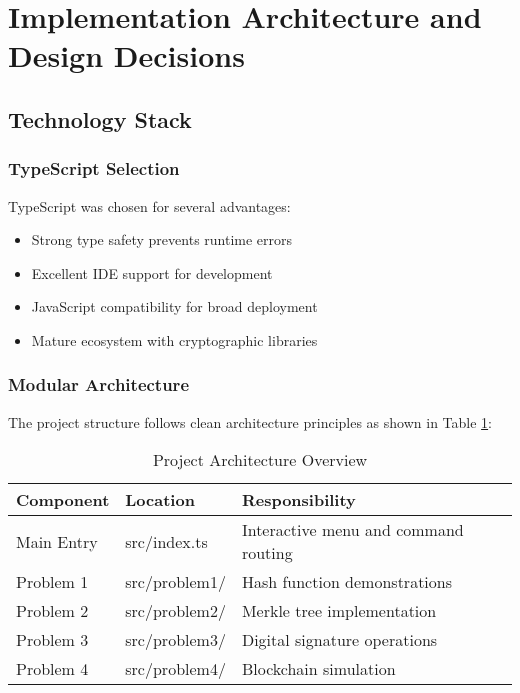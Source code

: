 \documentclass[12pt,a4paper]{article}
\begin{document}
\section{Implementation Architecture and Design Decisions}

\subsection{Technology Stack}

\subsubsection{TypeScript Selection}

TypeScript was chosen for several advantages:
\begin{itemize}
    \item Strong type safety prevents runtime errors
    \item Excellent IDE support for development
    \item JavaScript compatibility for broad deployment
    \item Mature ecosystem with cryptographic libraries
\end{itemize}

\subsubsection{Modular Architecture}

The project structure follows clean architecture principles as shown in Table \ref{tab:project-structure}:

\begin{table}[h]
\centering
\begin{tabular}{|l|l|p{6cm}|}
\hline
\textbf{Component} & \textbf{Location} & \textbf{Responsibility} \\
\hline
Main Entry & src/index.ts & Interactive menu and command routing \\
\hline
Problem 1 & src/problem1/ & Hash function demonstrations \\
\hline
Problem 2 & src/problem2/ & Merkle tree implementation \\
\hline
Problem 3 & src/problem3/ & Digital signature operations \\
\hline
Problem 4 & src/problem4/ & Blockchain simulation \\
\hline
\end{tabular}
\caption{Project Architecture Overview}
\label{tab:project-structure}
\end{table}
\end{document}
